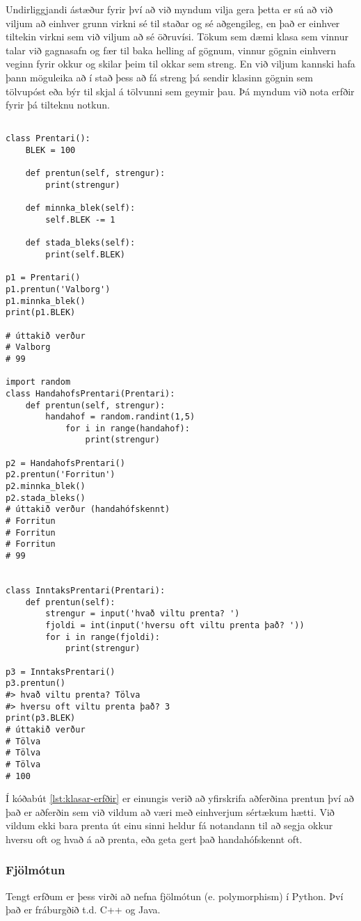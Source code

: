 Undirliggjandi ástæður fyrir því að við myndum vilja gera þetta er sú að við viljum að einhver grunn virkni sé til staðar og sé aðgengileg, en það er einhver tiltekin virkni sem við viljum að sé öðruvísi.
Tökum sem dæmi klasa sem vinnur talar við gagnasafn og fær til baka helling af gögnum, vinnur gögnin einhvern veginn fyrir okkur og skilar þeim til okkar sem streng.
En við viljum kannski hafa þann möguleika að í stað þess að fá streng þá sendir klasinn gögnin sem tölvupóst eða býr til skjal á tölvunni sem geymir þau.
Þá myndum við nota erfðir fyrir þá tilteknu notkun.

\begin{lstlisting}[caption=Erfðir kynntar með klasanum Prentari, label=lst:klasar-erfðir]

class Prentari():
	BLEK = 100
	
	def prentun(self, strengur):
		print(strengur)
	
	def minnka_blek(self):
		self.BLEK -= 1
	
	def stada_bleks(self):
		print(self.BLEK)

p1 = Prentari()
p1.prentun('Valborg')
p1.minnka_blek()
print(p1.BLEK)

# úttakið verður
# Valborg
# 99

import random
class HandahofsPrentari(Prentari):
	def prentun(self, strengur):
		handahof = random.randint(1,5)
			for i in range(handahof):
				print(strengur)

p2 = HandahofsPrentari()
p2.prentun('Forritun')
p2.minnka_blek()
p2.stada_bleks()
# úttakið verður (handahófskennt)
# Forritun
# Forritun
# Forritun
# 99


class InntaksPrentari(Prentari):
	def prentun(self):
		strengur = input('hvað viltu prenta? ')
		fjoldi = int(input('hversu oft viltu prenta það? '))
		for i in range(fjoldi):
			print(strengur)

p3 = InntaksPrentari()
p3.prentun()
#> hvað viltu prenta? Tölva
#> hversu oft viltu prenta það? 3
print(p3.BLEK)
# úttakið verður
# Tölva
# Tölva
# Tölva
# 100
\end{lstlisting}

Í kóðabút \ref{lst:klasar-erfðir} er einungis verið að yfirskrifa aðferðina prentun því að það er aðferðin sem við vildum að væri með einhverjum sértækum hætti.
Við vildum ekki bara prenta út einu sinni heldur fá notandann til að segja okkur hversu oft og hvað á að prenta, eða geta gert það handahófskennt oft.

\subsubsection{Fjölmótun}
Tengt erfðum er þess virði að nefna fjölmótun (e. polymorphism) í Python.
Því það er fráburgðið t.d. C++ og Java.

